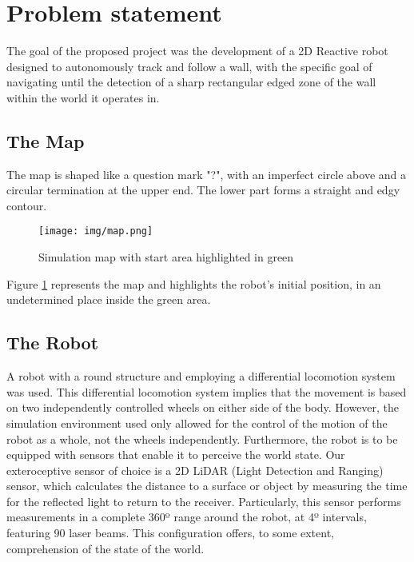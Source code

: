 \documentclass[conference]{IEEEtran}
\begin{document}
\section{Problem statement} \label{environment}

The goal of the proposed project was the development of a 2D Reactive robot designed to autonomously track and follow a wall, with the specific goal of navigating until the detection of a sharp rectangular edged zone of the wall within the world it operates in. 

\subsection{The Map}

The map is shaped like a question mark "?", with an imperfect circle above and a circular termination at the upper end. The lower part forms a straight and edgy contour.

\begin{figure}[h]
    \centering
    \texttt{[image: img/map.png]}
    \caption{Simulation map with start area highlighted in green}
    \label{fig:map}
\end{figure}

Figure \ref{fig:map} represents the map and highlights the robot's initial position, in an undetermined place inside the green area.

\subsection{The Robot}

A robot with a round structure and employing a differential locomotion system was used. This differential locomotion system implies that the movement is based on two independently controlled wheels on either side of the body. However, the simulation environment used only allowed for the control of the motion of the robot as a whole, not the wheels independently.
Furthermore, the robot is to be equipped with sensors that enable it to perceive the world state. Our exteroceptive sensor of choice is a 2D LiDAR (Light Detection and Ranging) sensor, which calculates the distance to a surface or object by measuring the time for the reflected light to return to the receiver. Particularly, this sensor performs measurements in a complete 360º range around the robot, at 4º intervals, featuring 90 laser beams. This configuration offers, to some extent, comprehension of the state of the world.
\end{document}
